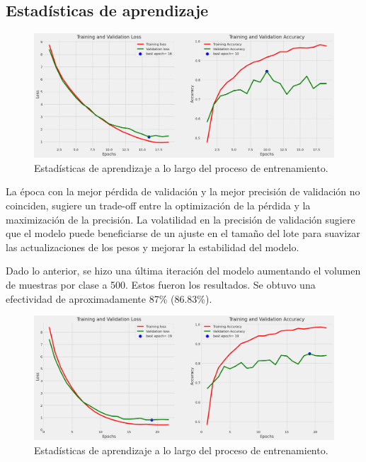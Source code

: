 \subsection{Estadísticas de aprendizaje}\label{sub:learning_statistics_p2}
		\begin{figure}[ht]%
      \begin{center}
      \includegraphics[width=1\textwidth]{./Graphics/training&validation_p2.png}
      \caption{Estadísticas de aprendizaje a lo largo del proceso de entrenamiento.\label{fig:training_validation_loss_p2}}
      \end{center}
		\end{figure}
  
La época con la mejor pérdida de validación y la mejor precisión de validación no coinciden, sugiere un trade-off entre la optimización de la pérdida y la maximización de la precisión. La volatilidad en la precisión de validación sugiere que el modelo puede beneficiarse de un ajuste en el tamaño del lote para suavizar las actualizaciones de los pesos y mejorar la estabilidad del modelo.

Dado lo anterior, se hizo una última iteración del modelo aumentando el volumen de muestras por clase a 500. Estos fueron los resultados. Se obtuvo una efectividad de aproximadamente 87\% (86.83\%).

\begin{figure}[ht]%
   \begin{center}
   \includegraphics[width=1\textwidth]{./Graphics/training&validation_p3.png}
   \caption{Estadísticas de aprendizaje a lo largo del proceso de entrenamiento.\label{fig:training_validation_loss_p3}}
   \end{center}
   \end{figure}

